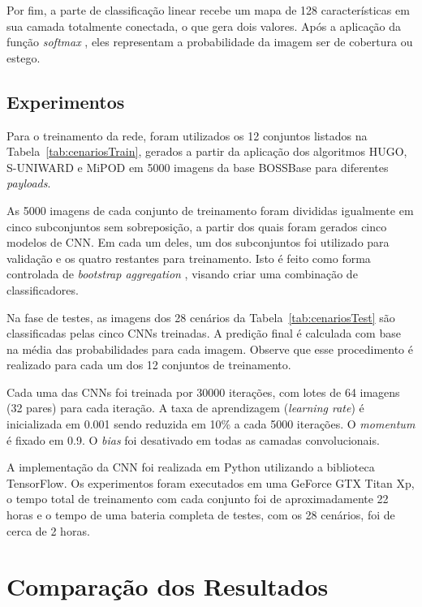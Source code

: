 Por fim, a parte de classificação linear recebe um mapa de 128 características em sua camada totalmente conectada, o que gera dois valores. Após a aplicação da função \textit{softmax} \cite{bishop2006pattern}, eles representam a probabilidade da imagem ser de cobertura ou estego.


\subsection{Experimentos}

Para o treinamento da rede, foram utilizados os 12 conjuntos listados na Tabela~\ref{tab:cenariosTrain}, gerados a partir da aplicação dos algoritmos HUGO, S-UNIWARD e MiPOD em 5000 imagens da base BOSSBase para diferentes \textit{payloads}.

As 5000 imagens de cada conjunto de treinamento foram divididas igualmente em cinco subconjuntos sem sobreposição, a partir dos quais foram gerados cinco modelos de CNN. Em cada um deles, um dos subconjuntos foi utilizado para validação e os quatro restantes para treinamento. Isto é feito como forma controlada de \textit{bootstrap aggregation} \cite{Breiman1996}, visando  criar uma combinação de classificadores. 

Na fase de testes, as imagens dos 28 cenários da Tabela~\ref{tab:cenariosTest} são classificadas pelas cinco CNNs treinadas. A predição final é calculada com base na média das probabilidades para cada imagem. Observe que esse procedimento é realizado para cada um dos 12 conjuntos de treinamento.

Cada uma das CNNs foi treinada por 30000 iterações, com lotes de 64 imagens (32 pares) para cada iteração. A taxa de aprendizagem (\textit{learning rate}) é inicializada em 0.001 sendo reduzida em 10\% a cada 5000 iterações. O \textit{momentum} é fixado em 0.9. O \textit{bias} foi desativado em todas as camadas convolucionais.

A implementação da CNN foi realizada em Python utilizando a biblioteca TensorFlow. Os experimentos foram executados em uma GeForce GTX Titan Xp, o tempo total de treinamento com cada conjunto foi de aproximadamente 22 horas e o tempo de uma bateria completa de testes, com os 28 cenários, foi de cerca de 2 horas.


\section{Comparação dos Resultados}
\label{sec:metricas}
	
